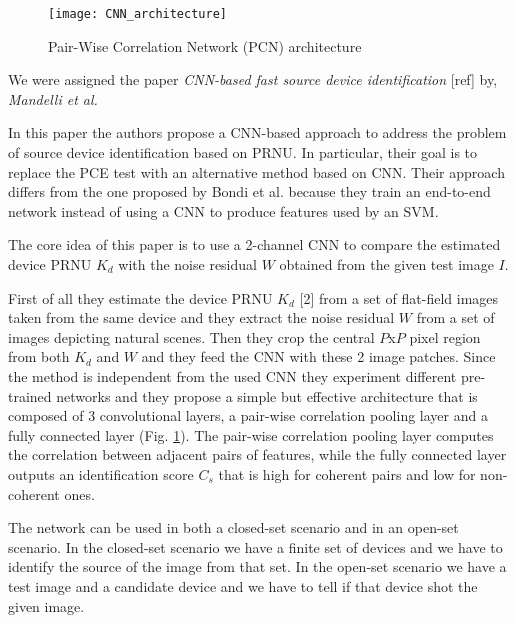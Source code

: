 \begin{figure}[t!]
    \centering
    \texttt{[image: CNN\_architecture]}
    \caption{Pair-Wise Correlation Network (PCN) architecture}
    \label{fig:CNN_architecture}
\end{figure}

We were assigned the paper \textit{CNN-based fast source device identification} [ref] by, \textit{Mandelli et al.}

In this paper the authors propose a CNN-based approach to address the problem of source device identification based on PRNU. 
In particular, their goal is to replace the PCE test with an alternative method based on CNN. Their approach differs from the one
proposed by Bondi et al. because they train an end-to-end network instead of using a CNN to produce features used by an SVM.

The core idea of this paper is to use a 2-channel CNN to compare the estimated device PRNU $K_d$ with the noise residual $W$ 
obtained from the given test image $I$.

First of all they estimate the device PRNU $K_d$ [2] from a set of flat-field images taken from the same device and they extract the
noise residual $W$ from a set of images depicting natural scenes.
Then they crop the central $P$x$P$ pixel region from both $K_d$ and $W$ and they feed the CNN with these 2 image patches.
Since the method is independent from the used CNN they experiment different pre-trained networks and they propose a simple but 
effective architecture that is composed of 3 convolutional layers, a pair-wise correlation pooling layer and a fully connected 
layer (Fig. \ref{fig:CNN_architecture}). The pair-wise correlation pooling layer computes the correlation between adjacent pairs of features, while the
fully connected layer outputs an identification score $C_s$ that is high for coherent pairs and low for non-coherent ones. 

The network can be used in both a closed-set scenario and in an open-set scenario. In the closed-set scenario we have a finite set 
of devices and we have to identify the source of the image from that set. In the open-set scenario we have a test image and a candidate
device and we have to tell if that device shot the given image.

